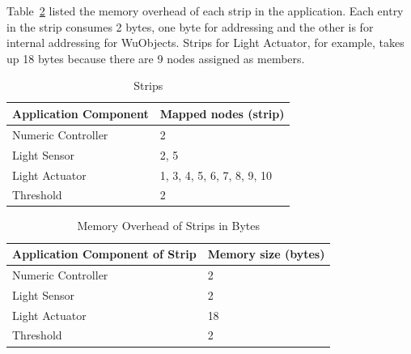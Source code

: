 Table~\ref{tbl:results-memory-overhead-strip} listed the memory overhead of each
strip in the application. Each entry in the strip consumes 2 bytes, one byte for
addressing and the other is for internal addressing for WuObjects. Strips for
Light Actuator, for example, takes up 18 bytes because there are 9 nodes
assigned as members.

\begin{table}
\centering
\caption{Strips}
\label{tbl:mapping-result}
  \begin{tabular}{|l|l|}
  \hline
  \textbf{Application Component} & \textbf{Mapped nodes (strip)} \\
  \hline
  Numeric Controller & 2 \\
  \hline
  Light Sensor & 2, 5 \\
  \hline
  Light Actuator & 1, 3, 4, 5, 6, 7, 8, 9, 10 \\
  \hline
  Threshold & 2 \\
  \hline
  \end{tabular}
\end{table}

\begin{table}
\centering
\caption{Memory Overhead of Strips in Bytes}
\label{tbl:results-memory-overhead-strip}
  \begin{tabular}{|l|l|}
  \hline
  \textbf{Application Component of Strip} & \textbf{Memory size (bytes)} \\
  \hline
  Numeric Controller & 2 \\
  \hline
  Light Sensor & 2 \\
  \hline
  Light Actuator & 18 \\
  \hline
  Threshold & 2 \\
  \hline
  \end{tabular}
\end{table}







